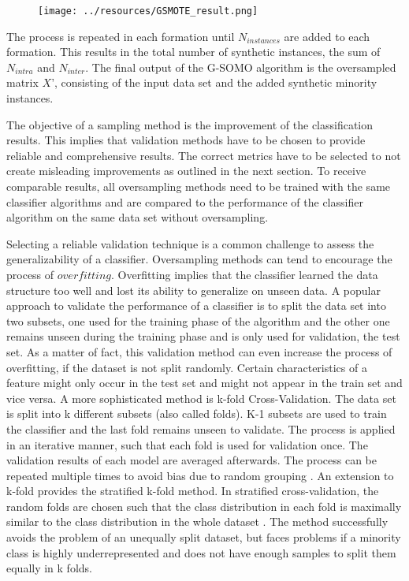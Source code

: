 \documentclass[parskip=full]{scrartcl}
\begin{document}
\begin{figure}[H]
	\centering
	\texttt{[image: ../resources/GSMOTE\_result.png]}
	\label{fig:GeometricConstruction}
\end{figure}

The process is repeated in each formation until $N_{instances}$ are added to each formation. This results in the total number of synthetic instances, the sum of $N_{intra}$ and $N_{inter}$. The final output of the G-SOMO algorithm is the oversampled matrix $X$', consisting of the input data set and the added synthetic minority instances.


The objective of a sampling method is the improvement of the classification results. This implies that validation methods have to be chosen to provide reliable and comprehensive results. The correct metrics have to be selected to not create misleading improvements as outlined in the next section. To receive comparable results, all oversampling methods need to be trained with the same classifier algorithms and are compared to the performance of the classifier algorithm on the same data set without oversampling.

Selecting a reliable validation technique is a common challenge to assess the generalizability of a classifier. Oversampling methods can tend to encourage the process of $overfitting$. Overfitting implies that the classifier learned the data structure too well and lost its ability to generalize on unseen data. A popular approach to validate the performance of a classifier is to split the data set into two subsets, one used for the training phase of the algorithm and the other one remains unseen during the training phase and is only used for validation, the test set. As a matter of fact, this validation method can even increase the process of overfitting, if the dataset is not split randomly. Certain characteristics of a feature might only occur in the test set and might not appear in the train set and vice versa. A more sophisticated method is k-fold Cross-Validation. The data set is split into k different subsets (also called folds). K-1 subsets are used to train the classifier and the last fold remains unseen to validate. The process is applied in an iterative manner, such that each fold is used for validation once. The validation results of each model are averaged afterwards. The process can be repeated multiple times to avoid bias due to random grouping \cite{Japkowicz2013}. An extension to k-fold provides the stratified k-fold method. In stratified cross-validation, the random folds are chosen such that the class distribution in each fold is maximally similar to the class distribution in the whole dataset \cite{Vanwinckelen2015}. The method successfully avoids the problem of an unequally split dataset, but faces problems if a minority class is highly underrepresented and does not have enough samples to split them equally in k folds.
\end{document}
